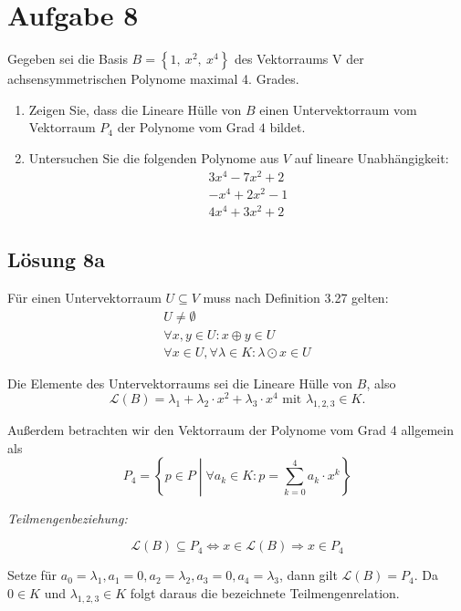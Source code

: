 \documentclass[main.tex]{subfiles}
\begin{document}
\section{Aufgabe 8}
Gegeben sei die Basis $B=\left\{1,\ x^{2} ,\ x^{4}\right\}$ des Vektorraums V der achsensymmetrischen Polynome maximal 4. Grades. 

\begin{enumerate}
    \item Zeigen Sie, dass die Lineare Hülle von $B$ einen Untervektorraum vom Vektorraum $P_{4}$ der Polynome vom Grad $4$ bildet.
    \item Untersuchen Sie die folgenden Polynome aus $V$ auf lineare Unabhängigkeit:
    \begin{gather*}
        3x^{4} -7x^{2} +2\\
        -x^{4} +2x^{2} -1\\
        4x^{4} +3x^{2} +2
    \end{gather*}    
\end{enumerate}

\subsection{Lösung 8a}

Für einen Untervektorraum $U \subseteq V$ muss nach Definition 3.27 gelten:
\begin{gather*}
	U \neq \emptyset \\
	\forall x,y \in U : x \oplus y \in U \\
	\forall x \in U, \forall \lambda \in K : \lambda \odot x \in U
\end{gather*}

Die Elemente des Untervektorraums sei die Lineare Hülle von $B$, also 
	$$
		\mathcal{L}(B) = \lambda_1 + \lambda_2 \cdotp x^{2} + \lambda_3 \cdotp x^{4} \text{ mit } \lambda_{1,2,3} \in K \text{.}
	$$
	
Außerdem betrachten wir den Vektorraum der Polynome vom Grad 4 allgemein als
	$$
		P_4 = \left\{ p \in P \middle| \forall a_k \in K : p = \sum_{k=0}^{4} a_k \cdotp x^k \right\}
	$$

\textit{Teilmengenbeziehung:}

\begin{equation*}
	\mathcal{L}(B) \subseteq P_4 \Leftrightarrow x \in \mathcal{L}(B) \Rightarrow x \in P_4
\end{equation*}

Setze für $a_0 = \lambda_1, a_1 = 0, a_2 = \lambda_2, a_3 = 0, a_4 = \lambda_3$, dann gilt $\mathcal{L}(B) = P_4$. Da $0 \in K$ und $\lambda_{1,2,3} \in K$ folgt daraus die bezeichnete Teilmengenrelation.\\
\end{document}
